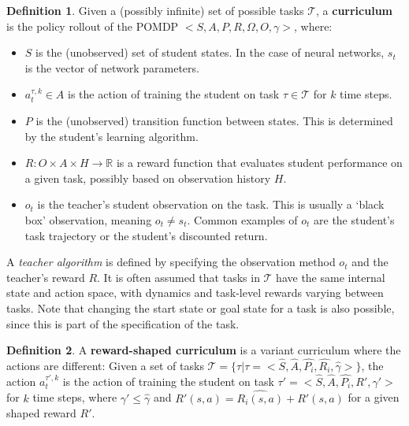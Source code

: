 \documentclass[letterpaper]{article}
\theoremstyle{definition}
\newtheorem{defn}{Definition}[section]
\begin{document}
\begin{defn} \label{defn:curriculum-pomdp}
	Given a (possibly infinite) set of possible tasks $\mathcal{T}$, a \textbf{curriculum} is the policy rollout of the POMDP $<S,A,P,R,\Omega,O, \gamma>$, where:
	\begin{itemize}
		\item $S$ is the (unobserved) set of student states. In the case of neural networks, $s_t$ is the vector of network parameters.
		\item $a_{t}^{\tau, k}\in A$ is the action of training the student on task $\tau\in \mathcal{T}$ for $k$ time steps.
		\item $P$ is the (unobserved) transition function between states. This is determined by the student's learning algorithm.
		\item $R:O\times A\times H \rightarrow \mathbb{R}$ is a reward function that evaluates student performance on a given task, possibly based on observation history $H$.
		\item $o_t$ is the teacher's student observation on the task. This is usually a `black box' observation, meaning $o_t\neq s_t$. Common examples of $o_t$ are the student's task trajectory or the student's discounted return.
	\end{itemize}	
\end{defn}

A \textit{teacher algorithm} is defined by specifying the observation method $o_t$ and the teacher's reward $R$. It is often assumed that tasks in $\mathcal{T}$ have the same internal state and action space, with dynamics and task-level rewards varying between tasks.
Note that changing the start state or goal state for a task is also possible, since this is part of the specification of the task.

\begin{defn} \label{defn:curriculum-pomdp-shaping}
	A \textbf{reward-shaped curriculum} is a variant curriculum where the actions are different:
	Given a set of tasks $\mathcal{T}=\{\tau|\tau=<\hat{S},\hat{A},\hat{P_i},\hat{R_i},\hat{\gamma}>\}$, the action $a_{t}^{\tau', k}$ is the action of training the student on task $\tau'=<\hat{S},\hat{A},\hat{P_i},R',\gamma'>$ for $k$ time steps, where $\gamma'\leq \hat{\gamma}$ and $R'(s,a)=\hat{R_i(s,a)}+R'(s,a)$ for a given shaped reward $R'$.
\end{defn}
\end{document}
